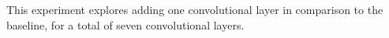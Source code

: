 
This experiment explores adding one convolutional layer in
comparison to the baseline, for a total of seven
convolutional layers.
